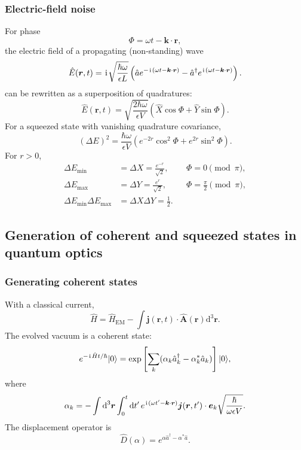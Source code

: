 \subsubsection{Electric-field noise}
For phase
\begin{equation}
\Phi=\omega t-\bm k\cdot\bm r,
\end{equation}
the electric field of a propagating (non-standing) wave 
\begin{equation}
 \hat E(\bm r,t)=
 \hspace{1pt}\mathrm{i}\hspace{1pt}\sqrt{\frac{\hbar\omega}{\epsilon L}}
 \left(\hat a e^{-\hspace{1pt}\mathrm{i}\hspace{1pt}(\omega t-\bm k\cdot\bm r)}
 -\hat a^\dagger e^{\hspace{1pt}\mathrm{i}\hspace{1pt}(\omega t-\bm k\cdot\bm r)}\right).
\end{equation}
can be rewritten as a superposition of quadratures:
\begin{equation}
\hat E(\bm r,t)=\sqrt{\frac{2\hbar\omega}{\epsilon V}}
\left(\hat X\cos\Phi+\hat Y\sin\Phi\right).
\end{equation}
For a squeezed state with vanishing quadrature covariance,
\begin{equation}
\boxed{
(\Delta E)^2=\frac{\hbar\omega}{\epsilon V}
\left(e^{-2r}\cos^2\Phi+e^{2r}\sin^2\Phi\right).}
\end{equation}
For $r>0$,
\begin{align}
\Delta E_{\min}&=\Delta X=\frac{e^{-r}}{\sqrt2},
&&\Phi=0\pmod\pi,\\
\Delta E_{\max}&=\Delta Y=\frac{e^r}{\sqrt2},
&&\Phi=\frac\pi2\pmod\pi,\\
\Delta E_{\min}\Delta E_{\max}&=\Delta X\Delta Y=\frac12.
\end{align}

\subsection{Generation of coherent and squeezed states in quantum optics}

\subsubsection{Generating coherent states}
With a classical current,
\begin{equation}
\hat H=\hat H_{\mathrm{EM}}
-\int\bm j(\bm r,t)\cdot\hat{\bm A}(\bm r)\text{d}^3{\bm r}.
\end{equation}
The evolved vacuum is a coherent state:
\begin{equation}
e^{-\hspace{1pt}\mathrm{i}\hspace{1pt}\hat Ht/\hbar}|{0}\rangle
=\exp\left[\sum_k(\alpha_k\hat a_k^\dagger
-\alpha_k^*\hat a_k)\right]|{0}\rangle,
\end{equation}
where
\begin{equation}
\alpha_k=-\int\text{d}^3{\bm r}\int_0^t\mathrm{d} t'
\,e^{\hspace{1pt}\mathrm{i}\hspace{1pt}(\omega t'-\bm k\cdot\bm r)}
\bm j(\bm r,t')\cdot\bm e_k
\sqrt{\frac{\hbar}{\omega\epsilon V}}.
\end{equation}
The displacement operator is
\begin{equation}
\boxed{\hat D(\alpha)=e^{\alpha\hat a^\dagger-\alpha^*\hat a}}.
\end{equation}

